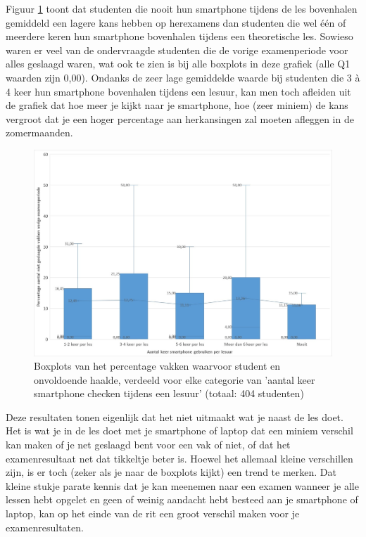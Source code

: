 Figuur \ref{fig:boxplot2} toont dat studenten die nooit hun smartphone tijdens de les bovenhalen gemiddeld een lagere kans hebben op herexamens dan studenten die wel één of meerdere keren hun smartphone bovenhalen tijdens een theoretische les. Sowieso waren er veel van de ondervraagde studenten die de vorige examenperiode voor alles geslaagd waren, wat ook te zien is bij alle boxplots in deze grafiek (alle Q1 waarden zijn 0,00). Ondanks de zeer lage gemiddelde waarde bij studenten die 3 à 4 keer hun smartphone bovenhalen tijdens een lesuur, kan men toch afleiden uit de grafiek dat hoe meer je kijkt naar je smartphone, hoe (zeer miniem) de kans vergroot dat je een hoger percentage aan herkansingen zal moeten afleggen in de zomermaanden.

\begin{figure}
	\includegraphics[width=\textwidth]
	{img/Boxplot2.jpg}
	\caption{Boxplots van het percentage vakken waarvoor student en onvoldoende haalde, verdeeld voor elke categorie van 'aantal keer smartphone checken tijdens een lesuur' (totaal: 404 studenten)}
	\label{fig:boxplot2}
\end{figure}

Deze resultaten tonen eigenlijk dat het niet uitmaakt wat je naast de les doet. Het is wat je in de les doet met je smartphone of laptop dat een miniem verschil kan maken of je net geslaagd bent voor een vak of niet, of dat het examenresultaat net dat tikkeltje beter is. Hoewel het allemaal kleine verschillen zijn, is er toch (zeker als je naar de boxplots kijkt) een trend te merken. Dat kleine stukje parate kennis dat je kan meenemen naar een examen wanneer je alle lessen hebt opgelet en geen of weinig aandacht hebt besteed aan je smartphone of laptop, kan op het einde van de rit een groot verschil maken voor je examenresultaten.


